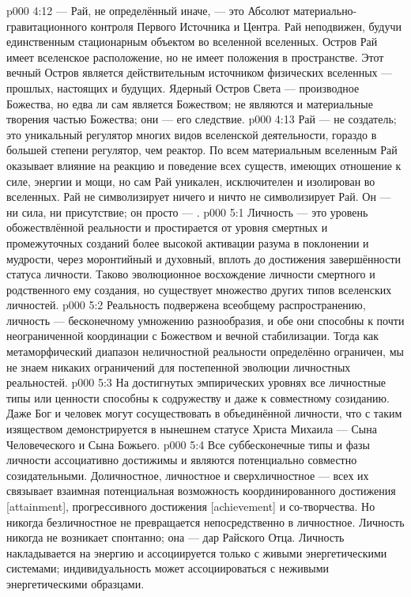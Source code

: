 \vs p000 4:12 \pc {} --- Рай, не определённый иначе, --- это Абсолют материально\hyp{}гравитационного контроля Первого Источника и Центра. Рай неподвижен, будучи единственным стационарным объектом во вселенной вселенных. Остров Рай имеет вселенское расположение, но не имеет положения в пространстве. Этот вечный Остров является действительным источником физических вселенных --- прошлых, настоящих и будущих. Ядерный Остров Света --- производное Божества, но едва ли сам является Божеством; не являются и материальные творения частью Божества; они --- его следствие.
\vs p000 4:13 Рай --- не создатель; это уникальный регулятор многих видов вселенской деятельности, гораздо в большей степени регулятор, чем реактор. По всем материальным вселенным Рай оказывает влияние на реакцию и поведение всех существ, имеющих отношение к силе, энергии и мощи, но сам Рай уникален, исключителен и изолирован во вселенных. Рай не символизирует ничего и ничто не символизирует Рай. Он --- ни сила, ни присутствие; он просто --- .
\vs p000 5:1 Личность --- это уровень обожествлённой реальности и простирается от уровня смертных и промежуточных созданий более высокой активации разума в поклонении и мудрости, через моронтийный и духовный, вплоть до достижения завершённости статуса личности. Таково эволюционное восхождение личности смертного и родственного ему создания, но существует множество других типов вселенских личностей.
\vs p000 5:2 Реальность подвержена всеобщему распространению, личность --- бесконечному умножению разнообразия, и обе они способны к почти неограниченной координации с Божеством и вечной стабилизации. Тогда как метаморфический диапазон неличностной реальности определённо ограничен, мы не знаем никаких ограничений для постепенной эволюции личностных реальностей.
\vs p000 5:3 На достигнутых эмпирических уровнях все личностные типы или ценности способны к содружеству и даже к совместному созиданию. Даже Бог и человек могут сосуществовать в объединённой личности, что с таким изяществом демонстрируется в нынешнем статусе Христа Михаила --- Сына Человеческого и Сына Божьего.
\vs p000 5:4 Все суббесконечные типы и фазы личности ассоциативно достижимы и являются потенциально совместно созидательными. Доличностное, личностное и сверхличностное --- всех их связывает взаимная потенциальная возможность координированного достижения [attainment], прогрессивного достижения [achievement] и со\hyp{}творчества. Но никогда безличностное не превращается непосредственно в личностное. Личность никогда не возникает спонтанно; она --- дар Райского Отца. Личность накладывается на энергию и ассоциируется только с живыми энергетическими системами; индивидуальность может ассоциироваться с неживыми энергетическими образцами.
